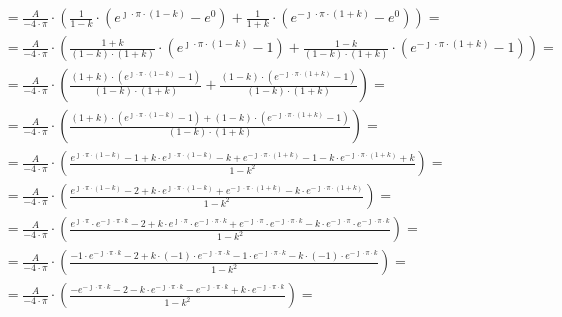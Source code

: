 \begin{task}
\begin{align*}
&=\frac{A}{-4 \cdot \pi} \cdot \left( \frac{1}{1 - k} \cdot \left(
e^{\jmath \cdot \pi \cdot \left(1 - k\right)} - e^{0} \right) + \frac{1}{1+k} \cdot \left( e^{-\jmath \cdot \pi \cdot \left(1+k\right)} - e^{0}\right) \right)=\\
&=\frac{A}{-4 \cdot \pi} \cdot \left( \frac{1+k}{\left(1 - k\right)\cdot \left(1+k\right)} \cdot \left(
e^{\jmath \cdot \pi \cdot \left(1 - k\right)} - 1 \right) + \frac{1-k}{\left(1 - k\right)\cdot \left(1+k\right)} \cdot \left( e^{-\jmath \cdot \pi \cdot \left(1+k\right)} - 1\right) \right)=\\
&=\frac{A}{-4 \cdot \pi} \cdot \left( \frac{\left(1+k\right)\cdot \left(
  e^{\jmath \cdot \pi \cdot \left(1 - k\right)} - 1 \right)}{\left(1 - k\right)\cdot \left(1+k\right)} + \frac{\left(1-k\right)\cdot \left( e^{-\jmath \cdot \pi \cdot \left(1+k\right)} - 1\right)}{\left(1 - k\right)\cdot \left(1+k\right)} \right)=\\
&=\frac{A}{-4 \cdot \pi} \cdot \left( \frac{\left(1+k\right)\cdot \left(
  e^{\jmath \cdot \pi \cdot \left(1 - k\right)} - 1 \right)+\left(1-k\right)\cdot \left( e^{-\jmath \cdot \pi \cdot \left(1+k\right)} - 1\right)}{\left(1 - k\right)\cdot \left(1+k\right)} \right)=\\
&=\frac{A}{-4 \cdot \pi} \cdot \left( \frac{e^{\jmath \cdot \pi \cdot \left(1 - k\right)} - 1 + k\cdot e^{\jmath \cdot \pi \cdot \left(1 - k\right)} - k+ e^{-\jmath \cdot \pi \cdot \left(1+k\right)} - 1 - k \cdot e^{-\jmath \cdot \pi \cdot \left(1+k\right)} + k}{1-k^2} \right)=\\
&=\frac{A}{-4 \cdot \pi} \cdot \left( \frac{e^{\jmath \cdot \pi \cdot \left(1 - k\right)} - 2 + k\cdot e^{\jmath \cdot \pi \cdot \left(1 - k\right)}+ e^{-\jmath \cdot \pi \cdot \left(1+k\right)} - k \cdot e^{-\jmath \cdot \pi \cdot \left(1+k\right)}}{1-k^2} \right)=\\
&=\frac{A}{-4 \cdot \pi} \cdot \left( \frac{e^{\jmath \cdot \pi}\cdot e^{-\jmath \cdot \pi \cdot k} - 2 + k\cdot e^{\jmath \cdot \pi } \cdot e^{-\jmath \cdot \pi \cdot k}+ e^{-\jmath \cdot \pi} \cdot e^{-\jmath \cdot \pi \cdot k} - k \cdot e^{-\jmath \cdot \pi}\cdot e^{-\jmath \cdot \pi \cdot k}}{1-k^2} \right)=\\
&=\frac{A}{-4 \cdot \pi} \cdot \left( \frac{-1 \cdot e^{-\jmath \cdot \pi \cdot k} - 2 + k\cdot \left(-1\right) \cdot e^{-\jmath \cdot \pi \cdot k} -1 \cdot e^{-\jmath \cdot \pi \cdot k} - k \cdot \left(-1\right)\cdot e^{-\jmath \cdot \pi \cdot k}}{1-k^2} \right)=\\
&=\frac{A}{-4 \cdot \pi} \cdot \left( \frac{-e^{-\jmath \cdot \pi \cdot k} - 2 - k \cdot e^{-\jmath \cdot \pi \cdot k} - e^{-\jmath \cdot \pi \cdot k} + k \cdot e^{-\jmath \cdot \pi \cdot k}}{1-k^2} \right)=\\

\end{align*}
\end{task}
